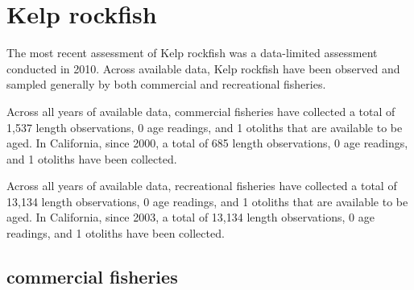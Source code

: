 \documentclass[11pt,
  english,
  letterpaper,
]{article}
\begin{document}

\hypertarget{kelp-rockfish}{%
\section{Kelp rockfish}\label{kelp-rockfish}}

\leavevmode\tagmcend\tagstructend


The most recent assessment of Kelp rockfish was a data-limited assessment conducted in 2010. Across available data, Kelp rockfish have been observed and sampled generally by both commercial and recreational fisheries.

\leavevmode\tagmcend\tagstructend\par


Across all years of available data, commercial fisheries have collected a total of 1,537 length observations, 0 age readings, and 1 otoliths that are available to be aged. In California, since 2000, a total of 685 length observations, 0 age readings, and 1 otoliths have been collected.

\leavevmode\tagmcend\tagstructend\par


Across all years of available data, recreational fisheries have collected a total of 13,134 length observations, 0 age readings, and 1 otoliths that are available to be aged. In California, since 2003, a total of 13,134 length observations, 0 age readings, and 1 otoliths have been collected.

\leavevmode\tagmcend\tagstructend\par


\hypertarget{commercial-fisheries-27}{%
\subsection{commercial fisheries}\label{commercial-fisheries-27}}

\leavevmode\tagmcend\tagstructend


\begingroup\fontsize{10}{12}\selectfont \begingroup\fontsize{10}{12}\selectfont
\end{document}
